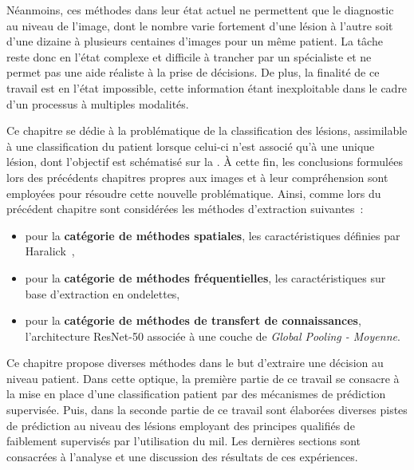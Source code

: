 Néanmoins, ces méthodes dans leur état actuel ne permettent que le diagnostic au niveau de l'image, dont le nombre varie fortement d'une lésion à l'autre soit d'une dizaine à plusieurs centaines d'images pour un même patient. La tâche reste donc en l'état complexe et difficile à trancher par un spécialiste et ne permet pas une aide réaliste à la prise de décisions. De plus, la finalité de ce travail est en l'état impossible, cette information étant inexploitable dans le cadre d'un processus à multiples modalités.\par

Ce chapitre se dédie à la problématique de la classification des lésions, assimilable à une classification du patient lorsque celui-ci n'est associé qu'à une unique lésion, dont l'objectif est schématisé sur la . À cette fin, les conclusions formulées lors des précédents chapitres propres aux images et à leur compréhension sont employées pour résoudre cette nouvelle problématique. Ainsi, comme lors du précédent chapitre sont considérées les méthodes d'extraction suivantes~:
\begin{itemize}
    \item pour la \textbf{catégorie de méthodes spatiales}, les caractéristiques définies par Haralick~,
    \item pour la \textbf{catégorie de méthodes fréquentielles}, les caractéristiques sur base d'extraction en ondelettes,
    \item pour la \textbf{catégorie de méthodes de transfert de connaissances}, l'architecture ResNet-50 associée à une couche de \textit{Global Pooling - Moyenne}.
\end{itemize}\par\par

Ce chapitre propose diverses méthodes dans le but d'extraire une décision au niveau patient. Dans cette optique, la première partie de ce travail se consacre à la mise en place d'une classification patient par des mécanismes de prédiction supervisée. Puis, dans la seconde partie de ce travail sont élaborées diverses pistes de prédiction au niveau des lésions employant des principes qualifiés de faiblement supervisés par l'utilisation du \gls{mil}. Les dernières sections sont consacrées à l'analyse et une discussion des résultats de ces expériences.\par

